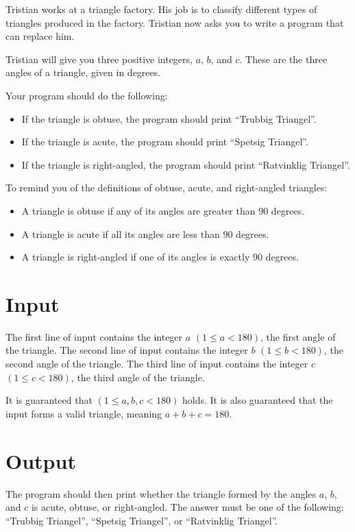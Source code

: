 
\noindent
Tristian works at a triangle factory.  
His job is to classify different types of triangles produced in the factory.  
Tristian now asks you to write a program that can replace him.

Tristian will give you three positive integers, $a$, $b$, and $c$.
These are the three angles of a triangle, given in degrees.

Your program should do the following:  
\begin{itemize}
  \item If the triangle is obtuse, the program should print ``Trubbig Triangel''.
  \item If the triangle is acute, the program should print ``Spetsig Triangel''.
  \item If the triangle is right-angled, the program should print ``Ratvinklig Triangel''.
\end{itemize}  

To remind you of the definitions of obtuse, acute, and right-angled triangles:  
\begin{itemize}
  \item A triangle is obtuse if any of its angles are greater than $90$ degrees.  
  \item A triangle is acute if all its angles are less than $90$ degrees.  
  \item A triangle is right-angled if one of its angles is exactly $90$ degrees.  
\end{itemize}  

\section*{Input}
The first line of input contains the integer $a$ $(1 \leq a < 180)$, the first angle of the triangle.
The second line of input contains the integer $b$ $(1 \leq b < 180)$, the second angle of the triangle.
The third line of input contains the integer $c$ $(1 \leq c < 180)$, the third angle of the triangle.

It is guaranteed that $(1 \leq a, b, c < 180)$ holds. 
It is also guaranteed that the input forms a valid triangle, meaning $a + b + c = 180$.  


\section*{Output}
The program should then print whether the triangle formed by the angles $a$, $b$, and $c$ is acute, obtuse,
or right-angled.
The answer must be one of the following: ``Trubbig Triangel'',
``Spetsig Triangel'', or ``Ratvinklig Triangel''.  


